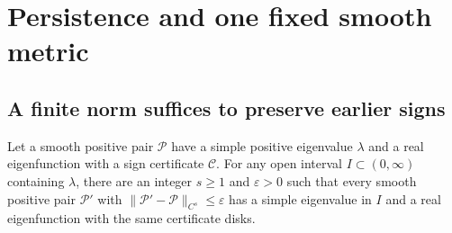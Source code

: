 \section{Persistence and one fixed smooth metric}\label{sec:limit}

\subsection{A finite norm suffices to preserve earlier signs}

\begin{lemma}\label{lem:persistence}
Let a smooth positive pair \(\mathcal P\) have a simple positive
eigenvalue \(\lambda\) and a real eigenfunction with a sign
certificate \(\mathcal C\). For any open interval
\(I\subset(0,\infty)\) containing \(\lambda\), there are
an integer \(s\ge1\) and \(\varepsilon>0\) such that every
smooth positive pair \(\mathcal P'\) with
\(\|\mathcal P'-\mathcal P\|_{C^s}\le\varepsilon\)
has a simple eigenvalue in \(I\) and a real eigenfunction
with the same certificate disks.
\end{lemma}

